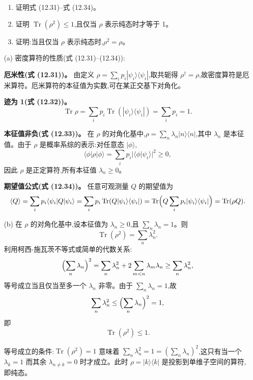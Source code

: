 \begin{question}
\begin{enumerate}
\item 证明式 (12.31)--式 (12.34)。
\item 证明 $\operatorname{Tr}(\rho^2)\le 1$,且仅当 $\rho$ 表示纯态时才等于 1。
\item 证明:当且仅当 $\rho$ 表示纯态时,$\rho^2=\rho$。
\end{enumerate}

\par\smallskip
{}

\end{question}
\begin{solution}
(a) 密度算符的性质(式 (12.31)--(12.34)):

\textbf{厄米性(式 (12.31))。} 由定义 $\rho = \sum_i p_i |\psi_i\rangle\langle\psi_i|$,取共轭得 $\rho^\dagger = \rho$,故密度算符是厄米算符。厄米算符的本征值为实数,可在某正交基下对角化。

\textbf{迹为 1(式 (12.32))。}
\[
\operatorname{Tr}\rho = \sum_i p_i \operatorname{Tr}(|\psi_i\rangle\langle\psi_i|) = \sum_i p_i = 1.
\]

\textbf{本征值非负(式 (12.33))。} 在 $\rho$ 的对角化基中,$\rho = \sum_n \lambda_n |n\rangle\langle n|$,其中 $\lambda_n$ 是本征值。由于 $\rho$ 是概率系综的表示:对任意态 $|\phi\rangle$,
\[
\langle\phi|\rho|\phi\rangle = \sum_i p_i |\langle\phi|\psi_i\rangle|^2 \ge 0,
\]
因此 $\rho$ 是正定算符,所有本征值 $\lambda_n \ge 0$。

\textbf{期望值公式(式 (12.34))。} 任意可观测量 $Q$ 的期望值为
\[
\langle Q\rangle = \sum_i p_i \langle\psi_i|Q|\psi_i\rangle
= \sum_i p_i \operatorname{Tr}(Q|\psi_i\rangle\langle\psi_i|)
= \operatorname{Tr}\Bigl(Q\sum_i p_i|\psi_i\rangle\langle\psi_i|\Bigr)
= \operatorname{Tr}(\rho Q).
\]

(b) 在 $\rho$ 的对角化基中,设本征值为 $\lambda_n \ge 0$,且 $\sum_n \lambda_n = 1$。则
\[
\operatorname{Tr}(\rho^2) = \sum_n \lambda_n^2.
\]
利用柯西-施瓦茨不等式或简单的代数关系:
\[
\Bigl(\sum_n \lambda_n\Bigr)^2 = \sum_n \lambda_n^2 + 2\sum_{m<n} \lambda_m\lambda_n \ge \sum_n \lambda_n^2,
\]
等号成立当且仅当至多一个 $\lambda_n$ 非零。由于 $\sum_n \lambda_n = 1$,故
\[
\sum_n \lambda_n^2 \le \Bigl(\sum_n \lambda_n\Bigr)^2 = 1,
\]
即
\[
\boxed{\operatorname{Tr}(\rho^2) \le 1.}
\]

等号成立的条件:$\operatorname{Tr}(\rho^2)=1$ 意味着 $\sum_n \lambda_n^2 = 1 = (\sum_n \lambda_n)^2$,这只有当一个 $\lambda_k = 1$ 而其余 $\lambda_{n\neq k} = 0$ 时才成立。此时 $\rho = |k\rangle\langle k|$ 是投影到单维子空间的算符,即纯态。


\end{solution}
